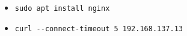 
\begin{issues}
\issueDraft
\end{issues}

\begin{itemize}
\item \verb|sudo apt install nginx|
\item \verb|curl --connect-timeout 5 192.168.137.13|
\end{itemize}
